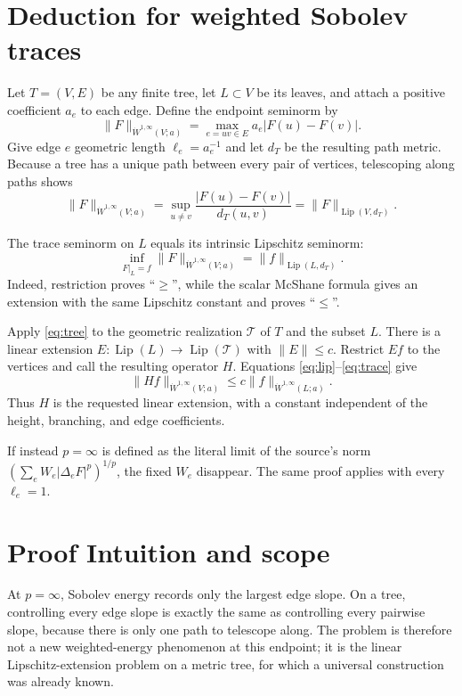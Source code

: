\documentclass[11pt]{article}
\newcommand{\Lip}{\operatorname{Lip}}
\begin{document}
\section{Deduction for weighted Sobolev traces}

Let $T=(V,E)$ be any finite tree, let $L\subset V$ be its leaves, and attach
a positive coefficient $a_e$ to each edge.  Define the endpoint seminorm by
\begin{equation}\label{eq:endpoint}
 \|F\|_{\dot W^{1,\infty}(V;a)}
 =\max_{e=uv\in E}a_e|F(u)-F(v)|.
\end{equation}
Give edge $e$ geometric length $\ell_e=a_e^{-1}$ and let $d_T$ be the
resulting path metric.  Because a tree has a unique path between every pair
of vertices, telescoping along paths shows
\begin{equation}\label{eq:lip}
 \|F\|_{\dot W^{1,\infty}(V;a)}
 =\sup_{u\ne v}\frac{|F(u)-F(v)|}{d_T(u,v)}
 =\|F\|_{\Lip(V,d_T)}.
\end{equation}

The trace seminorm on $L$ equals its intrinsic Lipschitz seminorm:
\begin{equation}\label{eq:trace}
 \inf_{F|_L=f}\|F\|_{\dot W^{1,\infty}(V;a)}
 =\|f\|_{\Lip(L,d_T)}.
\end{equation}
Indeed, restriction proves ``$\ge$'', while the scalar McShane formula gives
an extension with the same Lipschitz constant and proves ``$\le$''.

Apply \eqref{eq:tree} to the geometric realization $\mathcal T$ of $T$ and
the subset $L$.  There is a linear extension
$E:\Lip(L)\to\Lip(\mathcal T)$ with $\|E\|\le c$.  Restrict $Ef$ to the
vertices and call the resulting operator $H$.  Equations
\eqref{eq:lip}--\eqref{eq:trace} give
\[
 \|Hf\|_{\dot W^{1,\infty}(V;a)}
 \le c\|f\|_{\dot W^{1,\infty}(L;a)}.
\]
Thus $H$ is the requested linear extension, with a constant independent of
the height, branching, and edge coefficients.

If instead $p=\infty$ is defined as the literal limit of the source's norm
$(\sum_e W_e|\Delta_eF|^p)^{1/p}$, the fixed $W_e$ disappear.  The same proof
applies with every $\ell_e=1$.

\section{Proof Intuition and scope}

At $p=\infty$, Sobolev energy records only the largest edge slope.  On a tree,
controlling every edge slope is exactly the same as controlling every
pairwise slope, because there is only one path to telescope along.  The
problem is therefore not a new weighted-energy phenomenon at this endpoint;
it is the linear Lipschitz-extension problem on a metric tree, for which a
universal construction was already known.
\end{document}
